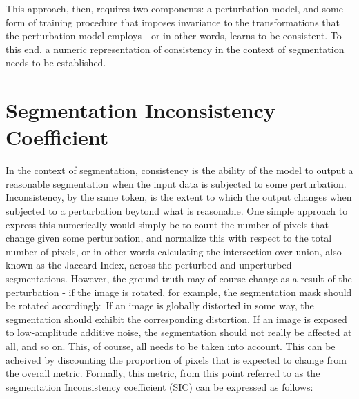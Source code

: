 This approach, then, requires two components: a perturbation model, and some form of training procedure that imposes invariance to the transformations that the perturbation model employs - or in other words, learns to be consistent. To this end, a numeric representation of consistency in the context of segmentation needs to be established.
\section{Segmentation Inconsistency Coefficient}
In the context of segmentation, consistency is the ability of the model to output a reasonable segmentation when the input data is subjected to some perturbation. Inconsistency, by the same token, is the extent to which the output changes when subjected to a perturbation beytond what is reasonable. One simple approach to express this numerically would simply be to count the number of pixels that change given some perturbation, and normalize this with respect to the total number of pixels, or in other words calculating the intersection over union, also known as the Jaccard Index, across the perturbed and unperturbed segmentations.  However, the ground truth may of course change as a result of the perturbation - if the image is rotated, for example, the segmentation mask should be rotated accordingly. If an image is globally distorted in some way, the segmentation should exhibit the corresponding distortion. If an image is exposed to low-amplitude additive noise, the segmentation should not really be affected at all, and so on. This, of course, all needs to be taken into account. This can be acheived by discounting the proportion of pixels that is expected to change from the overall metric. Formally, this metric, from this point referred to as the segmentation Inconsistency coefficient (SIC) can be expressed as follows:

